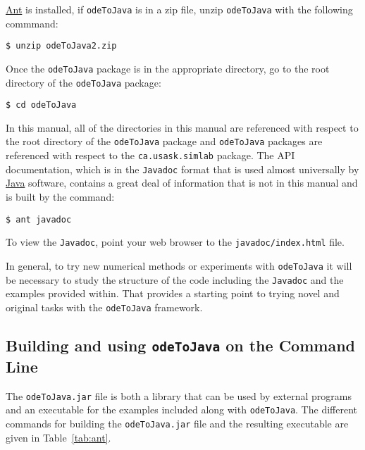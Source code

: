 \documentclass[10pt,letterpaper]{article}
\newcommand\odeToJavajar{{\tt odeToJava.jar}}
\newcommand\Ant{\href{http://ant.apache.org/}{\sc Ant}}
\newcommand\Java{\href{http://www.java.com/en/about/}{\sc Java}}
\newcommand\Javadoc{{\tt Javadoc}}
\newcommand\odj{{\tt odeToJava}}
\begin{document}
\Ant{} is installed, if \odj{} is in a zip file, unzip \odj{} with the following
commmand:
\begin{verbatim}
$ unzip odeToJava2.zip
\end{verbatim}
Once the \odj{} package is in the appropriate directory, go to the root
directory of the \odj{} package:
\begin{verbatim}
$ cd odeToJava
\end{verbatim}
In this manual, all of the directories in this manual are referenced with
respect to the root directory of the \odj{} package and \odj{} packages are
referenced with respect to the {\tt ca.usask.simlab} package. The API
documentation, which is in the \Javadoc{} format that is used almost universally
by \Java{} software, contains a great deal of information that is not in this
manual and is built by the command:
\begin{verbatim}
$ ant javadoc
\end{verbatim}
To view the \Javadoc, point your web browser to the {\tt javadoc/index.html}
file.

In general, to try new numerical methods or experiments with \odj{} it will be
necessary to study the structure of the code including the \Javadoc{} and the
examples provided within. That provides a starting point to trying novel and
original tasks with the \odj{} framework.

\subsection{Building and using \odj{} on the Command Line}\label{sec:build}

The \odeToJavajar{} file is both a library that can be used by external programs
and an executable for the examples included along with \odj. The different
commands for building the \odeToJavajar{} file and the resulting executable are
given in Table~\ref{tab:ant}.
\end{document}

